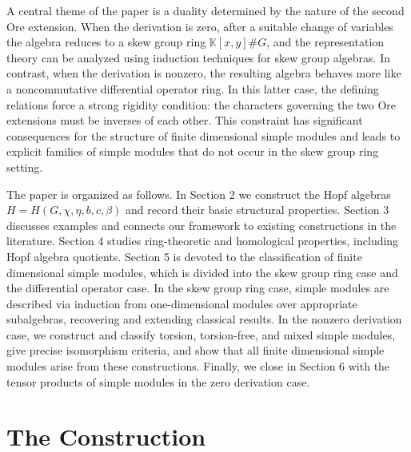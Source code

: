 \documentclass[11pt, twoside]{amsart}
\theoremstyle{definition}
\newcommand{\KK}{\mathbb{K}}
\begin{document}
A central theme of the paper is a duality determined by the nature of the second Ore extension. When the derivation is zero, after a suitable change of variables the algebra reduces to a skew group ring $\KK[x,y]\#G$, and the representation theory can be analyzed using induction techniques for skew group algebras. In contrast, when the derivation is nonzero, the resulting algebra behaves more like a noncommutative differential operator ring. In this latter case, the defining relations force a strong rigidity condition: the characters governing the two Ore extensions must be inverses of each other. This constraint has significant consequences for the structure of finite dimensional simple modules and leads to explicit families of simple modules that do not occur in the skew group ring setting.

The paper is organized as follows. In Section 2 we construct the Hopf algebras $H = H(G, \chi, \eta, b, c,\beta)$ and record their basic structural properties. Section 3 discusses examples and connects our framework to existing constructions in the literature. Section 4 studies ring-theoretic and homological properties, including Hopf algebra quotients. Section 5 is devoted to the classification of finite dimensional simple modules, which is divided into the skew group ring case and the differential operator case. In the skew group ring case, simple modules are described via induction from one-dimensional modules over appropriate subalgebras, recovering and extending classical results. In the nonzero derivation case, we construct and classify torsion, torsion-free, and mixed simple modules, give precise isomorphism criteria, and show that all finite dimensional simple modules arise from these constructions. Finally, we close in Section 6 with the tensor products of simple modules in the zero derivation case.



\section{The Construction}
\end{document}

